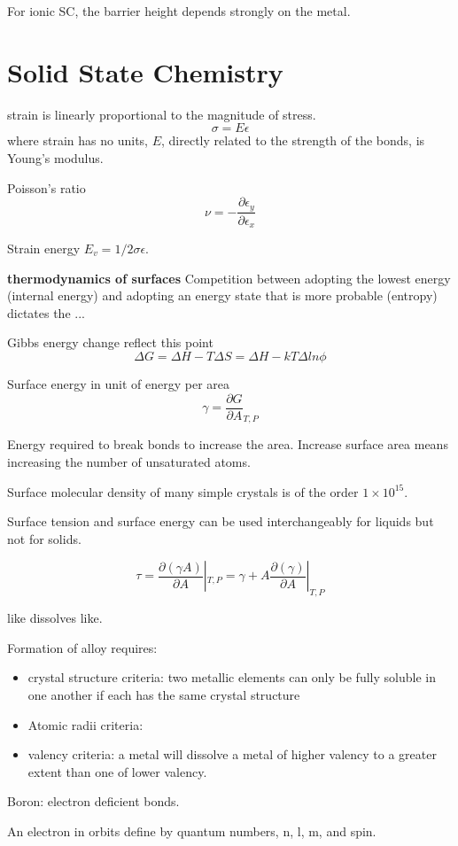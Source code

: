 For ionic SC, the barrier height depends strongly on the metal. 

\section{Solid State Chemistry}

strain is linearly proportional to the magnitude of stress. 
\[
\sigma = E \epsilon
\]
where strain has no units, $E$, directly related to the strength of the bonds, is Young's modulus. 

Poisson's ratio
\[
\nu = - \frac{\partial\epsilon_y}{\partial\epsilon_x}
\]

Strain energy $E_v = 1/2\sigma\epsilon$. 

\textbf{thermodynamics of surfaces} Competition between adopting the lowest energy (internal energy) and adopting an energy state that is more probable (entropy) dictates the ...

Gibbs energy change reflect this point
\[
\Delta G= \Delta H - T\Delta S = \Delta H - kT\Delta ln\phi
\]

Surface energy in unit of energy per area
\[
\gamma = \frac{\partial G}{\partial A}_{T,P}
\]

Energy required to break bonds to increase the area. Increase surface area means increasing the number of unsaturated atoms. 

Surface molecular density of many simple crystals is of the order $1\times 10^{15}$. 

Surface tension and surface energy can be used interchangeably for liquids but not for solids.

\[
\tau = \frac{\partial(\gamma A)}{\partial A}|_{T,P} = \gamma + A\frac{\partial(\gamma)}{\partial A}|_{T,P}
\]

like dissolves like. 

Formation of alloy requires:
\begin{itemize}
\item crystal structure criteria: two metallic elements can only be fully soluble in one another if each has the same crystal structure
\item Atomic radii criteria: 
\item valency criteria: a metal will dissolve a metal of higher valency to a greater extent than one of lower valency.
\end{itemize}

Boron: electron deficient bonds. 

An electron in orbits define by quantum numbers, n, l, m, and spin. 

